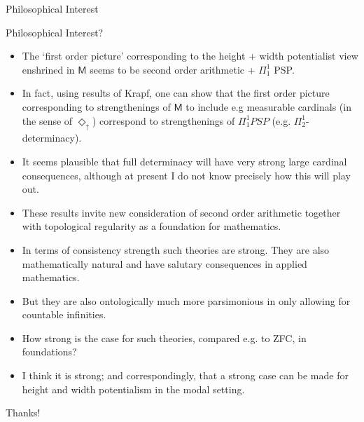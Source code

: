 \documentclass{beamer}
\newcommand{\du}{\Diamond_\uparrow}
\begin{document}
\begin{frame}{Philosophical Interest}
    \begin{block}{Philosophical Interest?}
        \begin{itemize}
        \item<2-> The `first order picture' corresponding to the height + width 
        potentialist view enshrined in $\mathsf{M}$ 
        seems to be second order arithmetic + $\Pi_1^1$ PSP.
        
        \item<3-> In fact, using results of Krapf, one can show that the first order 
            picture corresponding to strengthenings of $\mathsf{M}$ to include 
            e.g measurable cardinals (in the sense of $\du$) correspond to 
            strengthenings of $\Pi_1^1 PSP$ (e.g. $\Pi^1_2$-determinacy).
        \item<4-> It seems plausible that full determinacy will have very strong 
                large cardinal consequences, although at present I do not know
                precisely how this will play out.
        \item<5-> These results invite new consideration of second order arithmetic
                together with topological regularity as a foundation for mathematics.
        \item<6-> In terms of consistency strength such theories are strong. They are 
                also mathematically natural and have salutary consequences in applied 
                mathematics.
        \item<7-> But they are also ontologically much more parsimonious in only allowing 
                for countable infinities.
        \item<8-> How strong is the case for such theories, compared e.g. to ZFC, in foundations?
        \item<9-> I think it is strong; and correspondingly, that  a strong case can be made 
                    for height and width potentialism in the modal setting.
        \end{itemize}
    \end{block}
    
\end{frame}

\begin{frame}
\Huge{\centerline{Thanks!}}
\end{frame}
\end{document}
